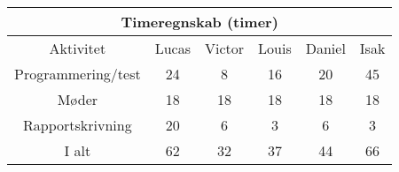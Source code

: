 \centering
\begin{tabular}{ |c|c|c|c|c|c|  }
 \hline
 \multicolumn{6}{|c|}{Timeregnskab (timer)} \\
 \hline
 Aktivitet & Lucas & Victor & Louis & Daniel & Isak\\
 \hline
 
 
 Programmering/test      & 24 & 8 & 16 & 20 & 45 \\
 
 Møder              & 18 & 18 & 18 & 18 & 18 \\
 
 Rapportskrivning   & 20 & 6 & 3 & 6 & 3 \\
 
 \hline
 
 I alt              & 62 & 32 & 37 & 44 & 66 \\
 
 
 \hline
\end{tabular}
